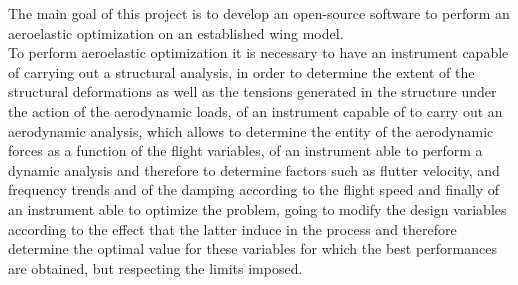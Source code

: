 The main goal of this project is to develop an open-source software to perform an aeroelastic optimization on an established wing model.\\
To perform aeroelastic optimization it is necessary to have an instrument capable of carrying out a structural analysis, in order to determine the extent of the structural deformations as well as the tensions generated in the structure under the action of the aerodynamic loads, of an instrument capable of to carry out an aerodynamic analysis, which allows to determine the entity of the aerodynamic forces as a function of the flight variables, of an instrument able to perform a dynamic analysis and therefore to determine factors such as flutter velocity, and frequency trends and of the damping according to the flight speed and finally of an instrument able to optimize the problem, going to modify the design variables according to the effect that the latter induce in the process and therefore determine the optimal value for these variables for which the best performances are obtained, but respecting the limits imposed. \\
